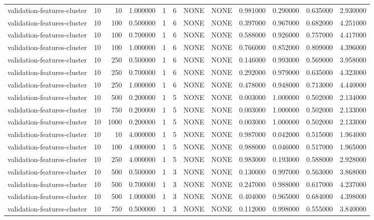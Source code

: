 \begin{tabular}{lrrrllllrrrr}
validation-features-cluster & 10 & 10 & 1.000000 & 1 & 6 & NONE & NONE & 0.981000 & 0.290000 & 0.635000 & 2.930000 \\
validation-features-cluster & 10 & 100 & 0.500000 & 1 & 6 & NONE & NONE & 0.397000 & 0.967000 & 0.682000 & 4.251000 \\
validation-features-cluster & 10 & 100 & 0.700000 & 1 & 6 & NONE & NONE & 0.588000 & 0.926000 & 0.757000 & 4.417000 \\
validation-features-cluster & 10 & 100 & 1.000000 & 1 & 6 & NONE & NONE & 0.766000 & 0.852000 & 0.809000 & 4.396000 \\
validation-features-cluster & 10 & 250 & 0.500000 & 1 & 6 & NONE & NONE & 0.146000 & 0.993000 & 0.569000 & 3.958000 \\
validation-features-cluster & 10 & 250 & 0.700000 & 1 & 6 & NONE & NONE & 0.292000 & 0.979000 & 0.635000 & 4.323000 \\
validation-features-cluster & 10 & 250 & 1.000000 & 1 & 6 & NONE & NONE & 0.478000 & 0.948000 & 0.713000 & 4.440000 \\
validation-features-cluster & 10 & 500 & 0.200000 & 1 & 5 & NONE & NONE & 0.003000 & 1.000000 & 0.502000 & 2.134000 \\
validation-features-cluster & 10 & 750 & 0.200000 & 1 & 5 & NONE & NONE & 0.003000 & 1.000000 & 0.502000 & 2.133000 \\
validation-features-cluster & 10 & 1000 & 0.200000 & 1 & 5 & NONE & NONE & 0.003000 & 1.000000 & 0.502000 & 2.133000 \\
validation-features-cluster & 10 & 10 & 4.000000 & 1 & 5 & NONE & NONE & 0.987000 & 0.042000 & 0.515000 & 1.964000 \\
validation-features-cluster & 10 & 100 & 4.000000 & 1 & 5 & NONE & NONE & 0.988000 & 0.046000 & 0.517000 & 1.965000 \\
validation-features-cluster & 10 & 250 & 4.000000 & 1 & 5 & NONE & NONE & 0.983000 & 0.193000 & 0.588000 & 2.928000 \\
validation-features-cluster & 10 & 500 & 0.500000 & 1 & 3 & NONE & NONE & 0.130000 & 0.997000 & 0.563000 & 3.868000 \\
validation-features-cluster & 10 & 500 & 0.700000 & 1 & 3 & NONE & NONE & 0.247000 & 0.988000 & 0.617000 & 4.237000 \\
validation-features-cluster & 10 & 500 & 1.000000 & 1 & 3 & NONE & NONE & 0.404000 & 0.965000 & 0.684000 & 4.398000 \\
validation-features-cluster & 10 & 750 & 0.500000 & 1 & 3 & NONE & NONE & 0.112000 & 0.998000 & 0.555000 & 3.840000 \\

\end{tabular}
